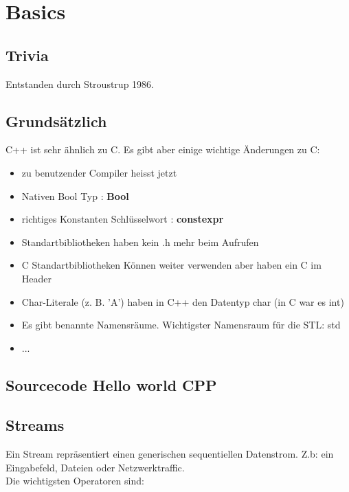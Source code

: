 \section{Basics}

\subsection{Trivia}

Entstanden durch Stroustrup 1986.

\subsection{Grundsätzlich}

C++ ist sehr ähnlich zu C. Es gibt aber einige wichtige Änderungen zu C:

\begin{itemize}[itemsep=1pt, parsep=0pt]
    \item zu benutzender Compiler heisst jetzt 
    \item Nativen Bool Typ : \textbf{Bool}
    \item richtiges Konstanten Schlüsselwort : \textbf{constexpr}
    \item Standartbibliotheken haben kein .h mehr beim Aufrufen
    \item C Standartbibliotheken Können weiter verwenden aber haben ein C im Header
    \item Char-Literale (z. B. 'A') haben in C++ den Datentyp char (in C war es int)
    \item Es gibt benannte Namensräume. Wichtigster Namensraum für die STL: std
    \item ...
\end{itemize}

\subsection{Sourcecode Hello world CPP}



\subsection{Streams}

Ein Stream repräsentiert einen generischen sequentiellen Datenstrom. Z.b: ein Eingabefeld, Dateien oder Netzwerktraffic.\\
Die wichtigsten Operatoren sind:

